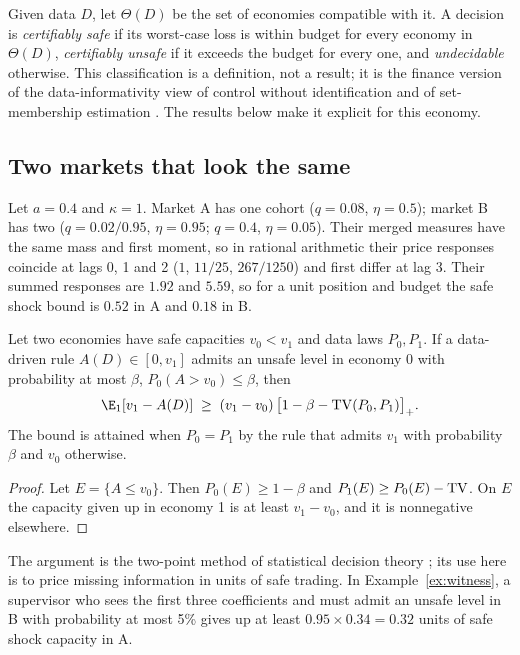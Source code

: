 Given data $D$, let $\Theta(D)$ be the set of economies compatible with it. A decision is \emph{certifiably safe} if its worst-case loss is within budget for every economy in $\Theta(D)$, \emph{certifiably unsafe} if it exceeds the budget for every one, and \emph{undecidable} otherwise. This classification is a definition, not a result; it is the finance version of the data-informativity view of control without identification \citep{vanwaarde2020} and of set-membership estimation \citep{milanese1991}. The results below make it explicit for this economy.

\subsection{Two markets that look the same}

\begin{example}\label{ex:witness}
Let $a=0.4$ and $\kappa=1$. Market A has one cohort ($q=0.08$, $\eta=0.5$); market B has two ($q=0.02/0.95$, $\eta=0.95$; $q=0.4$, $\eta=0.05$). Their merged measures have the same mass and first moment, so in rational arithmetic their price responses coincide at lags 0, 1 and 2 ($1$, $11/25$, $267/1250$) and first differ at lag 3. Their summed responses are $1.92$ and $5.59$, so for a unit position and budget the safe shock bound is $0.52$ in A and $0.18$ in B.
\end{example}

\begin{proposition}\label{prop:twoworld}
Let two economies have safe capacities $v_0<v_1$ and data laws $P_0,P_1$. If a data-driven rule $A(D)\in[0,v_1]$ admits an unsafe level in economy 0 with probability at most $\beta$, $P_0(A>v_0)\le\beta$, then
\[
\E_1[v_1-A(D)]\;\ge\;(v_1-v_0)\,\bigl[1-\beta-{\rm TV}(P_0,P_1)\bigr]_+ .
\]
The bound is attained when $P_0=P_1$ by the rule that admits $v_1$ with probability $\beta$ and $v_0$ otherwise.
\end{proposition}

\begin{proof}
Let $E=\{A\le v_0\}$. Then $P_0(E)\ge1-\beta$ and $P_1(E)\ge P_0(E)-{\rm TV}$. On $E$ the capacity given up in economy 1 is at least $v_1-v_0$, and it is nonnegative elsewhere.
\end{proof}

The argument is the two-point method of statistical decision theory \citep{lecam1986}; its use here is to price missing information in units of safe trading. In Example~\ref{ex:witness}, a supervisor who sees the first three coefficients and must admit an unsafe level in B with probability at most 5\% gives up at least $0.95\times0.34=0.32$ units of safe shock capacity in A.

